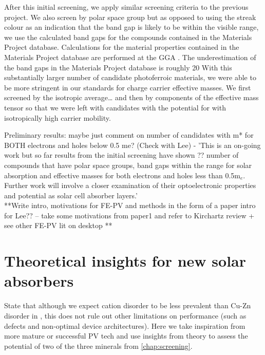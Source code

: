 \documentclass[11pt, twoside]{report}
\begin{document}
After this initial screening, we apply similar screening criteria to the previous project. We also screen by polar space group but as opposed to using the streak colour as an indication that the band gap is likely to be within the visible range, we use the calculated band gaps for the compounds contained in the Materials Project database. Calculations for the material properties contained in the Materials Project database are performed at the GGA \cite{GGA}.
The underestimation of the band gaps in the Materials Project database is roughly 20%
With this substantially larger number of candidate photoferroic materials, we were able to be more stringent in our standards for charge carrier effective masses. We first screened by the isotropic average… and then by components of the effective mass tensor so that we were left with candidates with the potential for with isotropically high carrier mobility.

Preliminary results: maybe just comment on number of candidates with m* for BOTH electrons and holes below 0.5 me? (Check with Lee) - 'This is an on-going work but so far results from the initial screening have shown ?? number of compounds that have polar space groups, band gaps within the range for solar absorption and effective masses for both electrons and holes less than 0.5m$_e$. Further work will involve a closer examination of their optoelectronic properties and potential as solar cell absorber layers.'\\

**Write intro, motivations for FE-PV and methods in the form of a paper intro for Lee?? – take some motivations from paper1 and refer to Kirchartz review + see other FE-PV lit on desktop **


\chapter{Theoretical insights for new solar absorbers}\label{chap:insights}
State that although we expect cation disorder to be less prevalent than Cu-Zn disorder in {\CZTS}, this does not rule out other limitations on performance (such as defects and non-optimal device architectures). Here we take inspiration from more mature or successful PV tech and use insights from theory to assess the potential of two of the three minerals from \autoref{chap:screening}.\\
\end{document}
